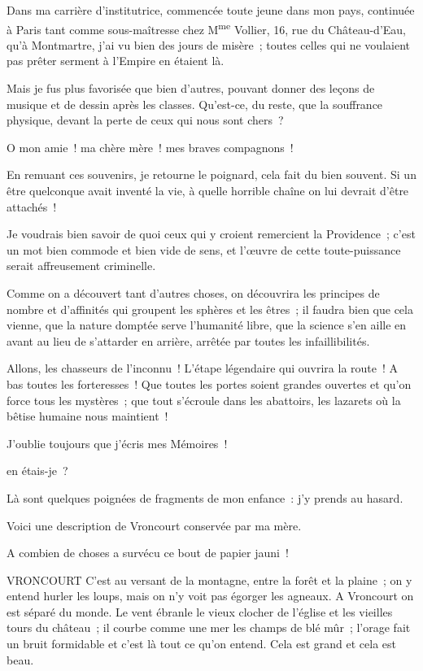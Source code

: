 \documentclass[french,twoside]{book} %
\newcommand\corr[1]{#1}
\newenvironment{quoteblock}%
  {\begin{quoting}}
  {\end{quoting}}
\newcommand\chaptercont{} %
\newenvironment{quotebar}{%
    \def\FrameCommand{{\color{rubric!10!}\vrule width 0.5em} \hspace{0.9em}}%
    \def\OuterFrameSep{\itemsep} %
    \MakeFramed {\advance\hsize-\width \FrameRestore}
  }%
  {%
    \endMakeFramed
  }
\renewenvironment{quoteblock}%
  {%
    \savenotes
    \setstretch{0.9}
    \normalfont
    \begin{quotebar}
  }
  {%
    \end{quotebar}
    \spewnotes
  }
\begin{document}
\chaptercont
\noindent Dans ma carrière d’institutrice, commencée toute jeune dans mon pays, continuée à Paris tant comme sous-maîtresse chez M\textsuperscript{me} Vollier, 16, rue du Château-d’Eau, qu’à Montmartre, j’ai vu bien des jours de misère ; toutes celles qui ne voulaient pas prêter serment à l’Empire en étaient là.\par
Mais je fus plus favorisée que bien d’autres, pouvant donner des leçons de musique et de dessin après les classes. Qu’est-ce, du reste, que la souffrance physique, devant la perte de ceux qui nous sont chers ?\par
O mon amie ! ma chère mère ! mes braves compagnons !\par
En remuant ces souvenirs, je retourne le poignard, cela fait du bien souvent. Si un être quelconque avait inventé la vie, à quelle horrible chaîne on lui devrait d’être attachés !\par
Je voudrais bien savoir de quoi ceux qui y  croient remercient la Providence ; c’est un mot bien commode et bien vide de sens, et l’œuvre de cette toute-puissance serait affreusement criminelle.\par
Comme on a découvert tant d’autres choses, on découvrira les principes de nombre et d’affinités qui groupent les sphères et les êtres ; il faudra bien que cela vienne, que la nature domptée serve l’humanité libre, que la science s’en aille en avant au lieu de s’attarder en arrière, arrêtée par toutes les infaillibilités.\par
Allons, les chasseurs de l’inconnu ! L’étape légendaire qui ouvrira la route ! A bas toutes les forteresses ! Que toutes les portes soient grandes ouvertes et qu’on force tous les mystères ; que tout s’écroule dans les abattoirs, les lazarets où la bêtise humaine nous maintient !\par
J’oublie toujours que j’écris mes Mémoires !\par
[{\corr Où}] en étais-je ?\par
Là sont quelques poignées de fragments de mon enfance : j’y prends au hasard.\par
Voici une description de Vroncourt conservée par ma mère.\par
A combien de choses a survécu ce bout de papier jauni !\par
 
\begin{quoteblock}
 VRONCOURT \noindent C’est au versant de la montagne, entre la forêt et la plaine ; on y entend hurler les loups, mais on n’y voit pas égorger les agneaux. A Vroncourt on est séparé du monde. Le vent ébranle le vieux clocher de l’église et les vieilles tours du château ; il courbe comme une mer les champs de blé mûr ; l’orage fait un bruit formidable et c’est là tout ce qu’on entend. Cela est grand et cela est beau.
 \end{quoteblock}
\end{document}

